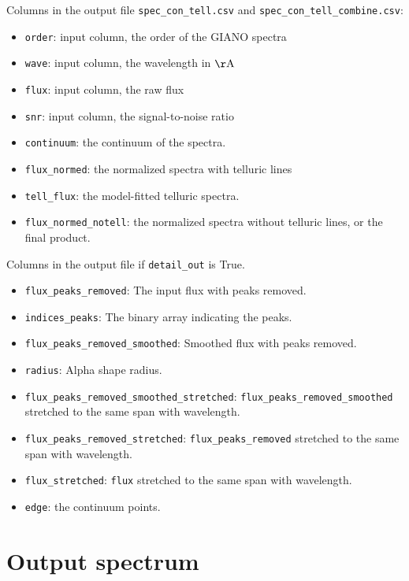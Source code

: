 \documentclass{article}
\begin{document}
Columns in the output file \texttt{spec\_con\_tell.csv} and \texttt{spec\_con\_tell\_combine.csv}:
\begin{itemize}
    \item \texttt{order}: input column, the order of the GIANO spectra
    \item \texttt{wave}: input column, the wavelength in $\mathrm{\AA}$
    \item \texttt{flux}: input column, the raw flux
    \item \texttt{snr}: input column, the signal-to-noise ratio
    \item \texttt{continuum}: the continuum of the spectra.
    \item \texttt{flux\_normed}: the normalized spectra with telluric lines
    \item \texttt{tell\_flux}: the model-fitted telluric spectra.
    \item \texttt{flux\_normed\_notell}: the normalized spectra without telluric lines, or the final product.
\end{itemize}

Columns in the output file if \texttt{detail\_out} is True.

\begin{itemize}
    \item \texttt{flux\_peaks\_removed}: The input flux with peaks removed.
    \item \texttt{indices\_peaks}: The binary array indicating the peaks.
    \item \texttt{flux\_peaks\_removed\_smoothed}: Smoothed flux with peaks removed.
    \item \texttt{radius}: Alpha shape radius.
    \item \texttt{flux\_peaks\_removed\_smoothed\_stretched}: \texttt{flux\_peaks\_removed\_smoothed} stretched to the same span with wavelength. 
    \item \texttt{flux\_peaks\_removed\_stretched}: \texttt{flux\_peaks\_removed} stretched to the same span with wavelength. 
    \item \texttt{flux\_stretched}: \texttt{flux} stretched to the same span with wavelength. 
    \item \texttt{edge}: the continuum points.
\end{itemize}

\section{Output spectrum}
\end{document}
